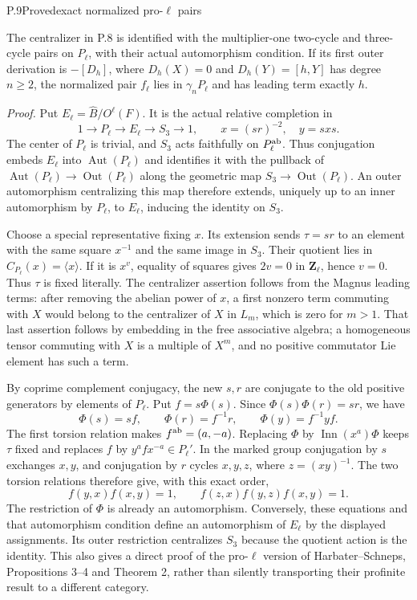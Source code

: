 \begin{statement}{P.9}{Proved}{exact normalized pro-$\ell$ pairs}
\citep[Propositions 3--4 and Theorem 2]{LitHarbaterSchneps2000}
\end{statement}
The centralizer in P.8 is identified with the multiplier-one
two-cycle and three-cycle pairs on $P_\ell$, with their actual
automorphism condition. If its first outer derivation is $-[D_h]$,
where $D_h(X)=0$ and $D_h(Y)=[h,Y]$ has degree $n\geq2$, the
normalized pair $f_\ell$ lies in $\gamma_nP_\ell$ and has leading
term exactly $h$.

\emph{Proof.}
Put $E_\ell=\widehat B/O^\ell(F)$. It is the actual relative
completion in
\[
 1\longrightarrow P_\ell\longrightarrow E_\ell
             \longrightarrow S_3\longrightarrow1,
 \qquad x=(sr)^{-2},\quad y=sxs.
\]
The center of $P_\ell$ is trivial, and $S_3$ acts faithfully on
$P_\ell^{\rm ab}$. Thus conjugation embeds $E_\ell$ into
$\operatorname{Aut}(P_\ell)$ and identifies it with the pullback
of $\operatorname{Aut}(P_\ell)\to\operatorname{Out}(P_\ell)$ along
the geometric map $S_3\to\operatorname{Out}(P_\ell)$.
An outer automorphism centralizing this map therefore extends,
uniquely up to an inner automorphism by $P_\ell$, to $E_\ell$,
inducing the identity on $S_3$.

Choose a special representative fixing $x$. Its extension sends
$\tau=sr$ to an element with the same square $x^{-1}$ and the
same image in $S_3$. Their quotient lies in $C_{P_\ell}(x)=\langle
x\rangle$. If it is $x^v$, equality of squares gives $2v=0$ in
$\mathbf Z_\ell$, hence $v=0$. Thus $\tau$ is fixed literally.
The centralizer assertion follows from the Magnus leading terms:
after removing the abelian power of $x$, a first nonzero term
commuting with $X$ would belong to the centralizer of $X$ in
$L_m$, which is zero for $m>1$. That last assertion follows by
embedding in the free associative algebra; a homogeneous tensor
commuting with $X$ is a multiple of $X^m$, and no positive
commutator Lie element has such a term.

By coprime complement conjugacy, the new $s,r$ are conjugate to
the old positive generators by elements of $P_\ell$. Put $f=s\Phi(s)$.
Since $\Phi(s)\Phi(r)=sr$, we have
\[
 \Phi(s)=sf,\qquad \Phi(r)=f^{-1}r,
 \qquad \Phi(y)=f^{-1}yf.
\]
The first torsion relation makes $f^{\rm ab}=(a,-a)$. Replacing
$\Phi$ by $\operatorname{Inn}(x^a)\Phi$ keeps $\tau$ fixed and
replaces $f$ by $y^af x^{-a}\in P_\ell'$. In the marked group
conjugation by $s$ exchanges $x,y$, and conjugation by $r$
cycles $x,y,z$, where $z=(xy)^{-1}$. The two torsion relations
therefore give, with this exact order,
\[
 f(y,x)f(x,y)=1,\qquad f(z,x)f(y,z)f(x,y)=1.
\]
The restriction of $\Phi$ is already an automorphism. Conversely,
these equations and that automorphism condition define an
automorphism of $E_\ell$ by the displayed assignments. Its outer
restriction centralizes $S_3$ because the quotient action is the
identity. This also gives a direct proof of the pro-$\ell$ version
of Harbater--Schneps, Propositions 3--4 and Theorem 2, rather than
silently transporting their profinite result to a different category.

